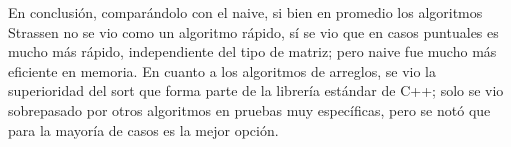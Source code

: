 \begin{mdframed}
    En conclusión, comparándolo con el naive, si bien en promedio los algoritmos Strassen no se vio 
    como un algoritmo rápido, sí se vio que en casos puntuales es mucho más rápido, independiente 
    del tipo de matriz; pero naive fue mucho más eficiente en memoria.
    En cuanto a los algoritmos de arreglos, se vio la superioridad del sort que forma parte de la 
    librería estándar de C++; solo se vio sobrepasado por otros algoritmos en pruebas muy 
    específicas, pero se notó que para la mayoría de casos es la mejor opción.
\end{mdframed}